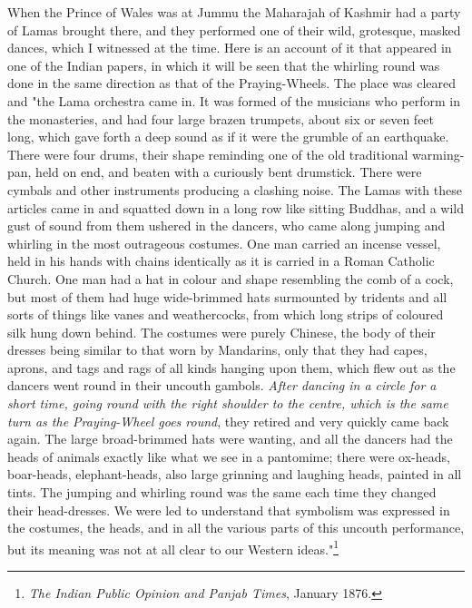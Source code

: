\documentclass[a4paper, 11pt, oneside, polutonikogreek, english]{article}
\begin{document}
When the Prince of Wales was at Jummu the Maharajah of Kashmir had a party of Lamas brought there, and they performed one of their wild, grotesque, masked dances, which I witnessed at the time. Here is an account of it that appeared in one of the Indian papers, in which it will be seen that the whirling round was done in the same direction as that of the Praying-Wheels. The place was cleared and "the Lama orchestra came in. It was formed of the musicians who perform in the monasteries, and had four large brazen trumpets, about six or seven feet long, which gave forth a deep sound as if it were the grumble of an earthquake. There were four drums, their shape reminding one of the old traditional warming-pan, held on end, and beaten with a curiously bent drumstick. There were cymbals and other instruments producing a clashing noise. The Lamas with these articles came in and squatted down in a long row like sitting Buddhas, and a wild gust of sound from them ushered in the dancers, who came along jumping and whirling in the most outrageous costumes. One man carried an incense vessel, held in his hands with chains identically as it is carried in a Roman Catholic Church. One man had a hat in colour and shape resembling the comb of a cock, but most of them had huge wide-brimmed hats surmounted by tridents and all sorts of things like vanes and weathercocks, from which long strips of coloured silk hung down behind. The costumes were purely Chinese, the body of their dresses being similar to that worn by Mandarins, only that they had capes, aprons, and tags and rags of all kinds hanging upon them, which flew out as the dancers went round in their uncouth gambols. \emph{After dancing in a circle for a short time, going round with the right shoulder to the centre, which is the same turn as the Praying-Wheel goes round}, they retired and very quickly came back again. The large broad-brimmed hats were wanting, and all the dancers had the heads of animals exactly like what we see in a pantomime; there were ox-heads, boar-heads, elephant-heads, also large grinning and laughing heads, painted in all tints. The jumping and whirling round was the same each time they changed their head-dresses. We were led to understand that symbolism was expressed in the costumes, the heads, and in all the various parts of this uncouth performance, but its meaning was not at all clear to our Western ideas."\footnote{\emph{The Indian Public Opinion and Panjab Times}, January 1876.}
\end{document}
